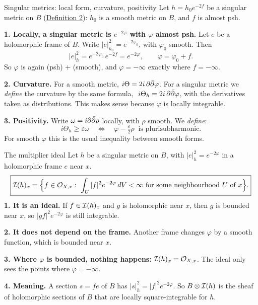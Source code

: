 \begin{frame}{Singular metrics: local form, curvature, positivity}
Let \(h=h_0e^{-2f}\) be a singular metric on \(B\) (\hyperlink{fr:singular-def}{Definition 2}): \(h_0\) is a smooth metric on \(B\), and \(f\) is almost psh.
\par\medskip
\textbf{1. Locally, a singular metric is \(e^{-2\varphi}\) with \(\varphi\) almost psh.} Let \(e\) be a holomorphic frame of \(B\). Write \(|e|_{h_0}^2=e^{-2\varphi_0}\), with \(\varphi_0\) smooth. Then
\[
|e|_h^2=e^{-2\varphi_0}\,e^{-2f}=e^{-2\varphi},
\qquad \varphi=\varphi_0+f .
\]
So \(\varphi\) is again (psh) + (smooth), and \(\varphi=-\infty\) exactly where \(f=-\infty\).
\par
\textbf{2. Curvature.} For a smooth metric, \(i\Theta=2i\,\partial\bar\partial\varphi\). For a singular metric we \emph{define} the curvature by the same formula,
\(\ i\Theta_h=2i\,\partial\bar\partial\varphi\),
with the derivatives taken as distributions. This makes sense because \(\varphi\) is locally integrable.
\par
\textbf{3. Positivity.} Write \(\omega=i\partial\bar\partial\rho\) locally, with \(\rho\) smooth. We \emph{define}:
\[
i\Theta_h\ge\varepsilon\omega
\quad\Longleftrightarrow\quad
\varphi-\tfrac{\varepsilon}{2}\rho\ \text{ is plurisubharmonic.}
\]
For smooth \(\varphi\) this is the usual inequality between smooth forms.
\end{frame}

\begin{frame}{The multiplier ideal}
Let \(h\) be a singular metric on \(B\), with \(|e|_h^2=e^{-2\varphi}\) in a holomorphic frame \(e\) near \(x\).
\[
\boxed{\cI(h)_x=\Bigl\{f\in\cO_{X,x}:\ \int_U|f|^2e^{-2\varphi}\,dV<\infty\ \text{for some neighbourhood } U \text{ of } x\Bigr\}.}
\]
\textbf{1. It is an ideal.} If \(f\in\mathcal I(h)_x\) and \(g\) is holomorphic near \(x\), then \(g\) is bounded near \(x\), so \(|gf|^2e^{-2\varphi}\) is still integrable.
\par\medskip
\textbf{2. It does not depend on the frame.} Another frame changes \(\varphi\) by a smooth function, which is bounded near \(x\).
\par\medskip
\textbf{3. Where \(\varphi\) is bounded, nothing happens:} \(\mathcal I(h)_x=\mathcal O_{X,x}\). The ideal only sees the points where \(\varphi=-\infty\).
\par\medskip
\textbf{4. Meaning.} A section \(s=fe\) of \(B\) has \(|s|_h^2=|f|^2e^{-2\varphi}\). So \(B\otimes\mathcal I(h)\) is the sheaf of holomorphic sections of \(B\) that are locally square-integrable for \(h\).
\end{frame}

